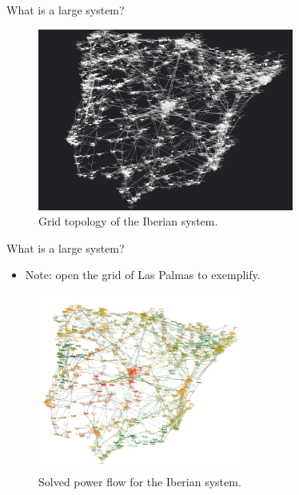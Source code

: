 \begin{frame}{What is a large system?}
      \begin{figure}[H]
        \centering
    \includegraphics[width=0.75\textwidth]{Images/ESPgrid_topo.png}
    \caption{Grid topology of the Iberian system.}
    \label{fig:peninsula}
    \end{figure}   

\end{frame}

\begin{frame}{What is a large system?}
  \begin{itemize}
    \item Note: open the grid of Las Palmas to exemplify.
  \end{itemize} 
      \begin{figure}[H]
        \centering
    \includegraphics[width=0.60\textwidth]{Images/ESPgrid_solved.png}
    \caption{Solved power flow for the Iberian system.}
    \label{fig:peninsula2}
    \end{figure}   
\end{frame}

